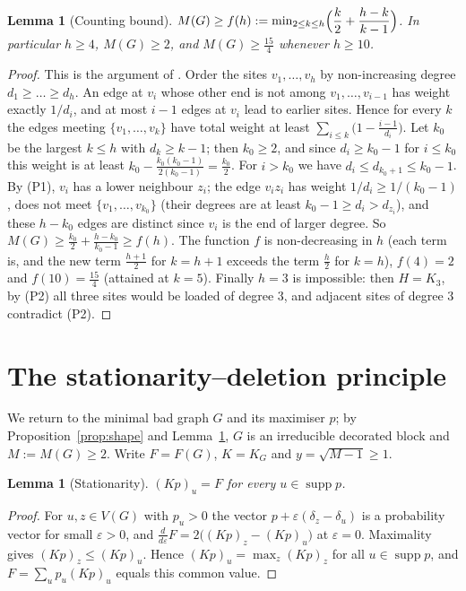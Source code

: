 \documentclass[11pt,a4paper]{article}
\newtheorem{lemma}[theorem]{Lemma}
\theoremstyle{definition}
\theoremstyle{remark}
\numberwithin{equation}{section}
\newcommand{\supp}{\operatorname{supp}}
\begin{document}
\begin{lemma}[Counting bound]\label{lem:count}
$M(G)\ge f(h):=\min_{2\le k\le h}\Bigl(\dfrac k2+\dfrac{h-k}{k-1}\Bigr)$. In
particular $h\ge4$, $M(G)\ge2$, and $M(G)\ge\frac{15}4$ whenever $h\ge10$.
\end{lemma}
\begin{proof}
This is the argument of \cite[Lemma~7]{DLS}. Order the sites
$v_1,\dots,v_h$ by non-increasing degree $d_1\ge\dots\ge d_h$. An edge at $v_i$
whose other end is not among $v_1,\dots,v_{i-1}$ has weight exactly $1/d_i$, and at
most $i-1$ edges at $v_i$ lead to earlier sites. Hence for every $k$ the edges
meeting $\{v_1,\dots,v_k\}$ have total weight at least
$\sum_{i\le k}\bigl(1-\frac{i-1}{d_i}\bigr)$. Let $k_0$ be the largest $k\le h$ with
$d_k\ge k-1$; then $k_0\ge2$, and since $d_i\ge k_0-1$ for $i\le k_0$ this weight is
at least $k_0-\frac{k_0(k_0-1)}{2(k_0-1)}=\frac{k_0}2$. For $i>k_0$ we have
$d_i\le d_{k_0+1}\le k_0-1$. By (P1), $v_i$ has a lower neighbour $z_i$; the edge
$v_iz_i$ has weight $1/d_i\ge1/(k_0-1)$, does not meet $\{v_1,\dots,v_{k_0}\}$
(their degrees are at least $k_0-1\ge d_i>d_{z_i}$), and these $h-k_0$ edges are
distinct since $v_i$ is the end of larger degree. So
$M(G)\ge\frac{k_0}2+\frac{h-k_0}{k_0-1}\ge f(h)$. The function
$f$ is non-decreasing in $h$ (each term is, and the new term $\frac{h+1}2$ for
$k=h+1$ exceeds the term $\frac h2$ for $k=h$), $f(4)=2$ and $f(10)=\frac{15}4$
(attained at $k=5$).
Finally $h=3$ is impossible: then $H=K_3$, by (P2) all three sites would be loaded
of degree $3$, and adjacent sites of degree $3$ contradict (P2).
\end{proof}

\section{The stationarity--deletion principle}\label{sec:sd}

We return to the minimal bad graph $G$ and its maximiser $p$; by
Proposition~\ref{prop:shape} and Lemma~\ref{lem:count}, $G$ is an irreducible
decorated block and $M:=M(G)\ge2$. Write $F=F(G)$, $K=K_G$ and $y=\sqrt{M-1}\ge1$.

\begin{lemma}[Stationarity]\label{lem:kkt}
$(Kp)_u=F$ for every $u\in\supp p$.
\end{lemma}
\begin{proof}
For $u,z\in V(G)$ with $p_u>0$ the vector $p+\varepsilon(\delta_z-\delta_u)$ is a
probability vector for small $\varepsilon>0$, and
$\frac{d}{d\varepsilon}F=2\bigl((Kp)_z-(Kp)_u\bigr)$ at $\varepsilon=0$. Maximality
gives $(Kp)_z\le(Kp)_u$. Hence $(Kp)_u=\max_z(Kp)_z$ for all $u\in\supp p$, and
$F=\sum_up_u(Kp)_u$ equals this common value.
\end{proof}
\end{document}
